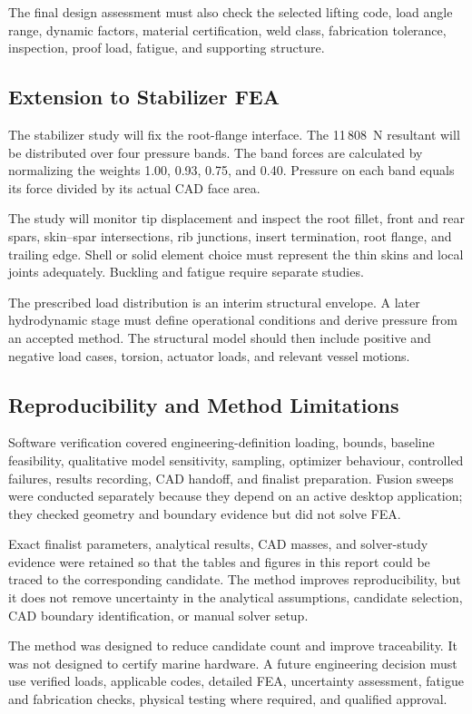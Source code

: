 The final design assessment must also check the selected lifting code, load
angle range, dynamic factors, material certification, weld class, fabrication
tolerance, inspection, proof load, fatigue, and supporting structure.

\subsection{Extension to Stabilizer FEA}
\label{sec:stabilizer-fea-method}

The stabilizer study will fix the root-flange interface. The 11\,808~N
resultant will be distributed over four pressure bands. The band forces are
calculated by normalizing the weights 1.00, 0.93, 0.75, and 0.40. Pressure on
each band equals its force divided by its actual CAD face area.

The study will monitor tip displacement and inspect the root fillet, front and
rear spars, skin--spar intersections, rib junctions, insert termination, root
flange, and trailing edge. Shell or solid element choice must represent the
thin skins and local joints adequately. Buckling and fatigue require separate
studies.

The prescribed load distribution is an interim structural envelope. A later
hydrodynamic stage must define operational conditions and derive pressure from
an accepted method. The structural model should then include positive and
negative load cases, torsion, actuator loads, and relevant vessel motions.

\subsection{Reproducibility and Method Limitations}
\label{sec:method-verification}

Software verification covered engineering-definition loading, bounds,
baseline feasibility, qualitative model sensitivity, sampling, optimizer
behaviour, controlled failures, results recording, CAD handoff, and finalist
preparation. Fusion sweeps were conducted separately because they depend on an
active desktop application; they checked geometry and boundary evidence but
did not solve FEA.

Exact finalist parameters, analytical results, CAD masses, and solver-study
evidence were retained so that the tables and figures in this report could be
traced to the corresponding candidate. The method improves reproducibility,
but it does not remove uncertainty in the analytical assumptions, candidate
selection, CAD boundary identification, or manual solver setup.

\screeningwarning

The method was designed to reduce candidate count and improve traceability. It
was not designed to certify marine hardware. A future engineering decision
must use verified loads, applicable codes, detailed FEA, uncertainty
assessment, fatigue and fabrication checks, physical testing where required,
and qualified approval.
